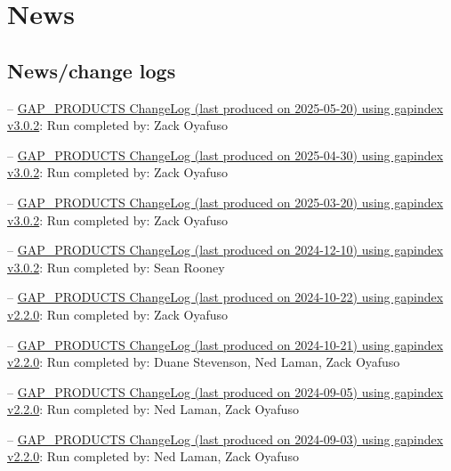 \documentclass[
  letterpaper,
  oneside,
  open=any]{scrbook}
\begin{document}
\chapter{News}\label{news}

\section{News/change logs}\label{newschange-logs}

--
\href{https://raw.githubusercontent.com/afsc-gap-products/gap_products/main/content/intro-news/2025-05-20.txt}{GAP\_PRODUCTS
ChangeLog (last produced on 2025-05-20) using gapindex v3.0.2}: Run
completed by: Zack Oyafuso

--
\href{https://raw.githubusercontent.com/afsc-gap-products/gap_products/main/content/intro-news/2025-04-30.txt}{GAP\_PRODUCTS
ChangeLog (last produced on 2025-04-30) using gapindex v3.0.2}: Run
completed by: Zack Oyafuso

--
\href{https://raw.githubusercontent.com/afsc-gap-products/gap_products/main/content/intro-news/2025-03-20.txt}{GAP\_PRODUCTS
ChangeLog (last produced on 2025-03-20) using gapindex v3.0.2}: Run
completed by: Zack Oyafuso

--
\href{https://raw.githubusercontent.com/afsc-gap-products/gap_products/main/content/intro-news/2024-12-10.txt}{GAP\_PRODUCTS
ChangeLog (last produced on 2024-12-10) using gapindex v3.0.2}: Run
completed by: Sean Rooney

--
\href{https://raw.githubusercontent.com/afsc-gap-products/gap_products/main/content/intro-news/2024-10-22.txt}{GAP\_PRODUCTS
ChangeLog (last produced on 2024-10-22) using gapindex v2.2.0}: Run
completed by: Zack Oyafuso

--
\href{https://raw.githubusercontent.com/afsc-gap-products/gap_products/main/content/intro-news/2024-10-21.txt}{GAP\_PRODUCTS
ChangeLog (last produced on 2024-10-21) using gapindex v2.2.0}: Run
completed by: Duane Stevenson, Ned Laman, Zack Oyafuso

--
\href{https://raw.githubusercontent.com/afsc-gap-products/gap_products/main/content/intro-news/2024-09-05.txt}{GAP\_PRODUCTS
ChangeLog (last produced on 2024-09-05) using gapindex v2.2.0}: Run
completed by: Ned Laman, Zack Oyafuso

--
\href{https://raw.githubusercontent.com/afsc-gap-products/gap_products/main/content/intro-news/2024-09-03.txt}{GAP\_PRODUCTS
ChangeLog (last produced on 2024-09-03) using gapindex v2.2.0}: Run
completed by: Ned Laman, Zack Oyafuso
\end{document}
